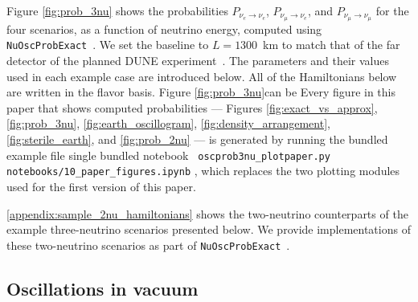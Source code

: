 \documentclass[final,5p,times,twocolumn]{elsarticle}
\providecommand{\DIFaddtex}[1]{{\protect\color{blue} \sf #1}} %
\providecommand{\DIFdeltex}[1]{{\protect\color{red} \scriptsize #1}} %
\providecommand{\DIFaddbegin}{} %
\providecommand{\DIFaddend}{} %
\providecommand{\DIFdelbegin}{} %
\providecommand{\DIFdelend}{} %
\providecommand{\DIFadd}[1]{\DIFaddtex{#1}} %
\providecommand{\DIFdel}[1]{\DIFdeltex{#1}} %
\begin{document}
Figure \ref{fig:prob_3nu} shows the probabilities $P_{\nu_e \to \nu_e}$, $P_{\nu_\mu \to \nu_e}$, and $P_{\nu_\mu \to \nu_\mu}$ for the four scenarios, as a function of neutrino energy, computed using {\tt NuOscProbExact}\ \cite{NuOscProbExact}.  We set the baseline to $L = 1300$~km to match that of the far detector of the planned DUNE experiment\ \cite{Abi:2018dnh}.  The parameters and their values used in each example case are introduced below.  All of the Hamiltonians below are written in the flavor basis.  \DIFdelbegin \DIFdel{Figure \ref{fig:prob_3nu}can be }\DIFdelend \DIFaddbegin \DIFadd{Every figure in this paper that shows computed probabilities --- Figures \ref{fig:exact_vs_approx}, \ref{fig:prob_3nu}, \ref{fig:earth_oscillogram}, \ref{fig:density_arrangement}, \ref{fig:sterile_earth}, and \ref{fig:prob_2nu} --- is }\DIFaddend generated by running the \DIFdelbegin \DIFdel{bundled example file }\DIFdelend \DIFaddbegin \DIFadd{single bundled notebook }\DIFaddend {\tt \DIFdelbegin \DIFdel{oscprob3nu\_plotpaper.py}\DIFdelend \DIFaddbegin \DIFadd{notebooks/10\_paper\_figures.ipynb}\DIFaddend }\DIFaddbegin \DIFadd{, which replaces the two plotting modules used for the first version of this paper}\DIFaddend .

\ref{appendix:sample_2nu_hamiltonians} shows the two-neutrino counterparts of the example three-neutrino scenarios presented below.  We provide implementations of these two-neutrino scenarios as part of {\tt NuOscProbExact}\ \cite{NuOscProbExact}.  


\subsection{Oscillations in vacuum}
\end{document}
